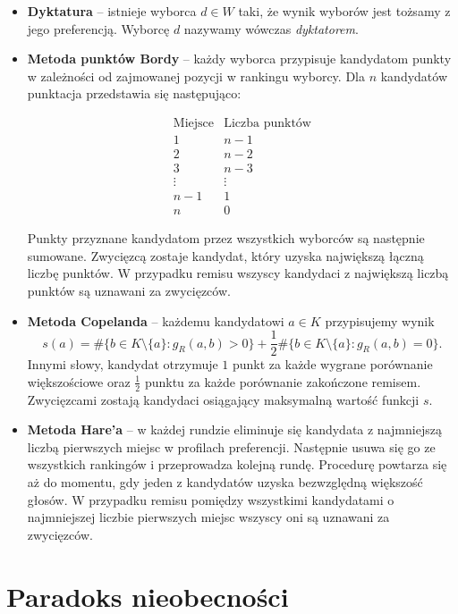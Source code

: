 \documentclass[12pt,a4paper]{mwrep}
\begin{document}
	\begin{itemize}
		\item \textbf{Dyktatura} – istnieje wyborca \(d \in W\) taki, że wynik wyborów jest tożsamy z jego preferencją. Wyborcę \(d\) nazywamy wówczas \textit{dyktatorem}.
		
		\item \textbf{Metoda punktów Bordy} – każdy wyborca przypisuje kandydatom punkty w zależności od zajmowanej pozycji w rankingu wyborcy. Dla \(n\) kandydatów punktacja przedstawia się następująco:
		
		\[
		\begin{array}{c|c}
			\text{Miejsce} & \text{Liczba punktów}\\
			\hline
			1 & n-1\\
			2 & n-2\\
			3 & n-3\\
			\vdots & \vdots\\
			n-1 & 1\\
			n & 0
		\end{array}
		\]
		
		Punkty przyznane kandydatom przez wszystkich wyborców są następnie sumowane. Zwycięzcą zostaje kandydat, który uzyska największą łączną liczbę punktów. W przypadku remisu wszyscy kandydaci z największą liczbą punktów są uznawani za zwycięzców.
		
		\item \textbf{Metoda Copelanda} – każdemu kandydatowi \(a \in K\) przypisujemy wynik
		\[
		s(a)=
		\#\{b\in K\setminus\{a\}: g_R(a,b)>0\}
		+\frac{1}{2}
		\#\{b\in K\setminus\{a\}: g_R(a,b)=0\}.
		\]
		Innymi słowy, kandydat otrzymuje \(1\) punkt za każde wygrane porównanie większościowe oraz \(\frac{1}{2}\) punktu za każde porównanie zakończone remisem. Zwycięzcami zostają kandydaci osiągający maksymalną wartość funkcji \(s\).
		
		\item \textbf{Metoda Hare'a} – w każdej rundzie eliminuje się kandydata z najmniejszą liczbą pierwszych miejsc w profilach preferencji. Następnie usuwa się go ze wszystkich rankingów i przeprowadza kolejną rundę. Procedurę powtarza się aż do momentu, gdy jeden z kandydatów uzyska bezwzględną większość głosów. W przypadku remisu pomiędzy wszystkimi kandydatami o najmniejszej liczbie pierwszych miejsc wszyscy oni są uznawani za zwycięzców.
		
	\end{itemize}
	
	\chapter{Paradoks nieobecności}
	
\end{document}
